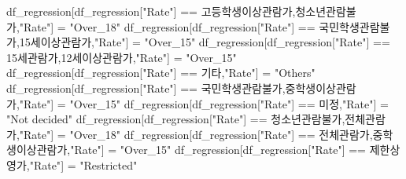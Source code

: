 \documentclass[
]{article}
\newenvironment{Shaded}{\begin{snugshade}}{\end{snugshade}}
\newcommand{\CommentTok}[1]{\textcolor[rgb]{0.56,0.35,0.01}{\textit{#1}}}
\newcommand{\NormalTok}[1]{#1}
\newcommand{\OtherTok}[1]{\textcolor[rgb]{0.56,0.35,0.01}{#1}}
\newcommand{\SpecialCharTok}[1]{\textcolor[rgb]{0.00,0.00,0.00}{#1}}
\newcommand{\StringTok}[1]{\textcolor[rgb]{0.31,0.60,0.02}{#1}}
\begin{document}
\begin{Shaded}
\begin{Highlighting}[]
\NormalTok{df\_regression[df\_regression[}\StringTok{"Rate"}\NormalTok{] }\SpecialCharTok{==} \StringTok{\textquotesingle{}고등학생이상관람가,청소년관람불가\textquotesingle{}}\NormalTok{,}\StringTok{"Rate"}\NormalTok{] }\OtherTok{=} \StringTok{"Over\_18"}
\NormalTok{df\_regression[df\_regression[}\StringTok{"Rate"}\NormalTok{] }\SpecialCharTok{==} \StringTok{\textquotesingle{}국민학생관람불가,15세이상관람가\textquotesingle{}}\NormalTok{,}\StringTok{"Rate"}\NormalTok{] }\OtherTok{=} \StringTok{"Over\_15"}
\NormalTok{df\_regression[df\_regression[}\StringTok{"Rate"}\NormalTok{] }\SpecialCharTok{==} \StringTok{\textquotesingle{}15세관람가,12세이상관람가\textquotesingle{}}\NormalTok{,}\StringTok{"Rate"}\NormalTok{] }\OtherTok{=} \StringTok{"Over\_15"}
\NormalTok{df\_regression[df\_regression[}\StringTok{"Rate"}\NormalTok{] }\SpecialCharTok{==} \StringTok{\textquotesingle{}기타\textquotesingle{}}\NormalTok{,}\StringTok{"Rate"}\NormalTok{] }\OtherTok{=} \StringTok{"Others"}
\NormalTok{df\_regression[df\_regression[}\StringTok{"Rate"}\NormalTok{] }\SpecialCharTok{==} \StringTok{\textquotesingle{}국민학생관람불가,중학생이상관람가\textquotesingle{}}\NormalTok{,}\StringTok{"Rate"}\NormalTok{] }\OtherTok{=} \StringTok{"Over\_15"}
\NormalTok{df\_regression[df\_regression[}\StringTok{"Rate"}\NormalTok{] }\SpecialCharTok{==} \StringTok{\textquotesingle{}미정\textquotesingle{}}\NormalTok{,}\StringTok{"Rate"}\NormalTok{] }\OtherTok{=} \StringTok{"Not decided"}
\NormalTok{df\_regression[df\_regression[}\StringTok{"Rate"}\NormalTok{] }\SpecialCharTok{==} \StringTok{\textquotesingle{}청소년관람불가,전체관람가\textquotesingle{}}\NormalTok{,}\StringTok{"Rate"}\NormalTok{] }\OtherTok{=} \StringTok{"Over\_18"}
\NormalTok{df\_regression[df\_regression[}\StringTok{"Rate"}\NormalTok{] }\SpecialCharTok{==} \StringTok{\textquotesingle{}전체관람가,중학생이상관람가\textquotesingle{}}\NormalTok{,}\StringTok{"Rate"}\NormalTok{] }\OtherTok{=} \StringTok{"Over\_15"}
\NormalTok{df\_regression[df\_regression[}\StringTok{"Rate"}\NormalTok{] }\SpecialCharTok{==} \StringTok{\textquotesingle{}제한상영가\textquotesingle{}}\NormalTok{,}\StringTok{"Rate"}\NormalTok{] }\OtherTok{=} \StringTok{"Restricted"}
\end{Highlighting}
\end{Shaded}

\begin{Shaded}
\end{Shaded}
\end{document}
